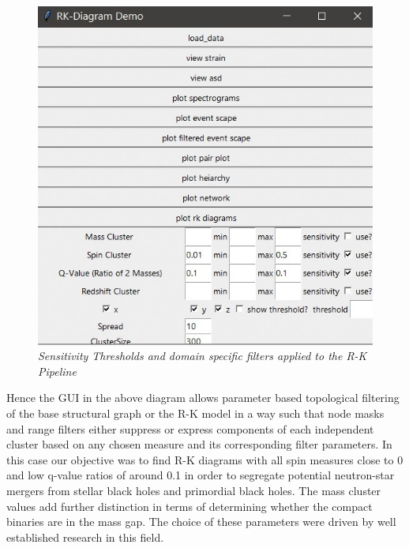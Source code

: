     \begin{figure}[H]
        \centering
        \includegraphics[width=1.0\linewidth]{images/71_00_Sensitivity Thresholds.jpg}
        \caption{\textit{Sensitivity Thresholds and domain specific filters applied to the R-K Pipeline }}
        \label{fig:LIGO13_PlaceHolder_fig}
    \end{figure}

Hence the GUI in the above diagram allows parameter based topological filtering of the base structural graph or the R-K model in a way such that node masks and range filters either suppress or express components of each independent cluster based on any chosen measure and its corresponding filter parameters. In this case our objective was to find R-K diagrams with all spin measures close to 0 and low q-value ratios of around 0.1 in order to segregate potential neutron-star mergers from stellar black holes and primordial black holes. The mass cluster values add further distinction in terms of determining whether the compact binaries are in the mass gap. The choice of these parameters were driven by well established research in this field. \cite{00.7_LIGOBayesianAnalysis} \cite{00.6_LIGOAnalysisPipeline} \cite{24.5_GWParameterEsitmation} \cite{24.7_qvalueestimation} \cite{24.8_PBHdetectionparameters} \cite{24.9_EffectiveSpin}


